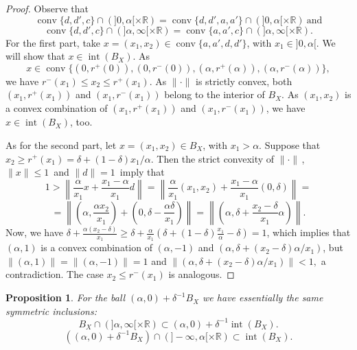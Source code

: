 \documentclass[12pt]{amsproc}
\newtheorem{prop}[theorem]{Proposition}
\theoremstyle{remark}
\def\equi{=}
\def\interior{\operatorname{int}}
\def\conv{\operatorname{conv}}
\def\R{\mathbb R}
\begin{document}
\begin{proof}
Observe that 
$$\conv\{d, d', c\}\cap(]0,\alpha[\times\R)=\conv\{d, d',a ,a'\}\cap(]0,\alpha[\times\R)\mathrm{\ and}$$ 
$$\conv\{d, d',c\}\cap(]\alpha,\infty[\times\R)=\conv\{a, a',c\}\cap(]\alpha,\infty[\times\R). $$
For the first part, take $x\equi(x_1,x_2)\in\conv\{a, a', d, d'\}$, with $x_1\in]0, \alpha[$. 
We will show that $x\in\interior(B_X)$. As 
$$x\in\conv\{(0,r^+(0)), (0,r^-(0)), (\alpha, r^+(\alpha)), (\alpha, r^-(\alpha))\},$$
we have $r^-(x_1)\leq x_2\leq r^+(x_1)$. As $\|\cdot\|$ is 
strictly convex, both $(x_1,r^+(x_1))$ and $(x_1,r^-(x_1))$ belong to the interior of $B_X$. 
As $(x_1, x_2)$ is a convex combination of $(x_1,r^+(x_1))$ and $(x_1,r^-(x_1))$, we have 
$x\in\interior(B_X)$, too. 

As for the second part, let $x\equi(x_1,x_2)\in B_X$, with $x_1>\alpha$. Suppose 
that $x_2\geq r^+(x_1)=\delta+(1-\delta)x_1/\alpha$. Then 
the strict convexity of $\|\cdot\|\,$, $\|x\|\leq 1\,$ and $\|d\|= 1\,$ imply that
$$1>\left\|\frac{\alpha}{x_1}x+\frac{x_1-\alpha}{x_1}d\right\|=
\left\|\frac{\alpha}{x_1}(x_1,x_2)+\frac{x_1-\alpha}{x_1}(0,\delta)\right\|=$$
$$=\left\|\left(\alpha,\frac{\alpha x_2}{x_1}\right)+ \left(0,\delta-\frac{\alpha\delta}{x_1}\right)\right\|
=\left\|\left(\alpha,\delta+\frac{x_2-\delta}{x_1}\alpha\right)\right\|.$$
Now, we have 
$\delta+\frac{\alpha(x_2-\delta)}{x_1}\geq \delta+\frac{\alpha}{x_1}(\delta+(1-\delta)\frac{x_1}{\alpha}-\delta)
=1$, which implies that  $(\alpha,1)$ is a convex combination of $(\alpha,-1)$ and 
$(\alpha,\delta+(x_2-\delta)\alpha/x_1)$, but $\|(\alpha,1)\|=\|(\alpha,-1)\|=1$ and 
$\|(\alpha,\delta+(x_2-\delta)\alpha/x_1)\|<1,$ a contradiction. 
The case $x_2\leq r^-(x_1)$ is analogous. 
\end{proof}

\begin{prop}\label{bolabola}
For the ball $(\alpha,0)+\delta^{-1}B_X$ we have essentially the same symmetric inclusions: 
$$B_X\cap(]\alpha, \infty[\times\R)\subset(\alpha,0)+\delta^{-1}\interior(B_X). $$
$$((\alpha,0)+\delta^{-1}B_X)\cap(]-\infty,\alpha[\times\R)\subset\interior(B_X). $$
\end{prop}
\end{document}
